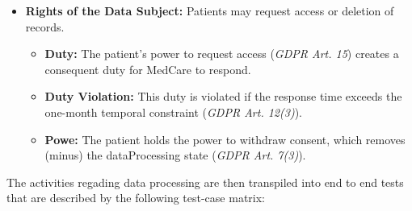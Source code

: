 \begin{itemize}
    \item \textbf{Rights of the Data Subject:}  
    Patients may request access or deletion of records.
    \begin{itemize}
        \item \textbf{Duty:} The patient's power to request access (\textit{GDPR Art. 15}) creates a consequent duty for MedCare to respond.
        \item \textbf{Duty Violation:} This duty is violated if the response time exceeds the one-month temporal constraint (\textit{GDPR Art. 12(3)}).
        \item \textbf{Powe:} The patient holds the power to withdraw consent, which removes (minus) the dataProcessing state (\textit{GDPR Art. 7(3)}).
    \end{itemize}

\end{itemize}

The activities regading data processing are then transpiled into end to end tests that are described by the following test-case matrix:


